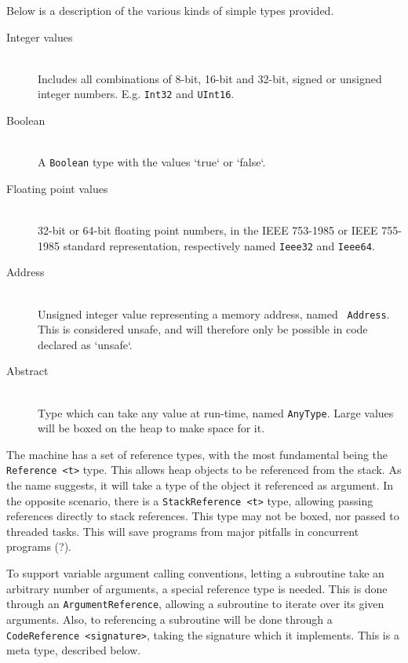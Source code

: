 Below is a description of the various kinds of simple types provided.

\begin{description}
\item[Integer values] \hfill\\
  Includes all combinations of 8-bit, 16-bit and 32-bit, signed or unsigned
  integer numbers. E.g. {\tt Int32} and {\tt UInt16}.

\item[Boolean] \hfill\\
  A {\tt Boolean} type with the values `true` or `false`.

\item[Floating point values] \hfill\\
  32-bit or 64-bit floating point numbers, in the IEEE 753-1985 or IEEE 755-1985
  standard representation, respectively named {\tt Ieee32} and {\tt Ieee64}.

\item[Address] \hfill\\
  Unsigned integer value representing a memory address, named {\tt
    Address}. This is considered unsafe, and will therefore only be possible in
  code declared as `unsafe`.

\item[Abstract] \hfill\\
  Type which can take any value at run-time, named {\tt AnyType}. Large values
  will be boxed on the heap to make space for it.
\end{description}


The machine has a set of reference types, with the most fundamental being the
{\tt Reference <t>} type. This allows heap objects to be referenced from the
stack. As the name suggests, it will take a type of the object it referenced as
argument. In the opposite scenario, there is a {\tt StackReference <t>} type,
allowing passing references directly to stack references. This type may not be
boxed, nor passed to threaded tasks. This will save programs from major pitfalls
in concurrent programs (?).

To support variable argument calling conventions, letting a subroutine take an
arbitrary number of arguments, a special reference type is needed. This is done
through an {\tt ArgumentReference}, allowing a subroutine to iterate over its
given arguments. Also, to referencing a subroutine will be done through a {\tt
  CodeReference <signature>}, taking the signature which it implements. This is
a meta type, described below.


